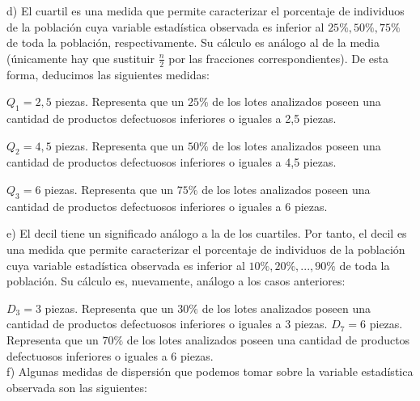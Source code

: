d) El cuartil es una medida que permite caracterizar el porcentaje de individuos de la población cuya variable estadística observada es inferior al $25\%, 50\%, 75\%$ de toda la población, respectivamente. Su cálculo es análogo al de la media (únicamente hay que sustituir $\frac{n}{2}$ por las fracciones correspondientes). De esta forma, deducimos las siguientes medidas:

$Q_{1} = 2,5$ piezas. Representa que un $25\%$ de los lotes analizados poseen una cantidad de productos defectuosos inferiores o iguales a 2,5 piezas.

$Q_{2} = 4,5$ piezas. Representa que un $50\%$ de los lotes analizados poseen una cantidad de productos defectuosos inferiores o iguales a 4,5 piezas.

$Q_{3} = 6$ piezas. Representa que un $75\%$ de los lotes analizados poseen una cantidad de productos defectuosos inferiores o iguales a 6 piezas.

e) El decil tiene un significado análogo a la de los cuartiles. Por tanto, el decil es una medida que permite caracterizar el porcentaje de individuos de la población cuya variable estadística observada es inferior al $10\%, 20\%,..., 90\%$ de toda la población. Su cálculo es, nuevamente, análogo a los casos anteriores: 

$D_{3} = 3$ piezas. Representa que un $30\%$ de los lotes analizados poseen una cantidad de productos defectuosos inferiores o iguales a 3 piezas.
$D_{7} = 6$ piezas. Representa que un $70\%$ de los lotes analizados poseen una cantidad de productos defectuosos inferiores o iguales a 6 piezas. \\

f) Algunas medidas de dispersión que podemos tomar sobre la variable estadística observada son las siguientes:

